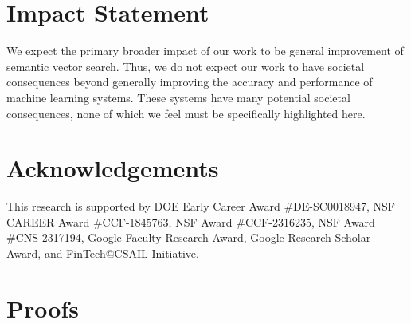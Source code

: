 \documentclass{article}
\theoremstyle{plain}
\theoremstyle{definition}
\theoremstyle{remark}
\begin{document}
\section*{Impact Statement}

We expect the primary broader impact of our work to be general improvement of semantic vector search. Thus, we do not expect our work to have societal consequences beyond generally improving the accuracy and performance of machine learning systems. These systems have many potential societal consequences, none of which we feel must be specifically highlighted here.


\section*{Acknowledgements}
 This research is supported by
DOE Early Career Award \#DE-SC0018947,
NSF CAREER Award \#CCF-1845763, NSF Award \#CCF-2316235, NSF Award \#CNS-2317194,
Google Faculty Research Award, Google Research Scholar Award, and
FinTech@CSAIL Initiative.







\newpage
\appendix
\onecolumn

\section{Proofs}\label{sec:proofs}
\end{document}
